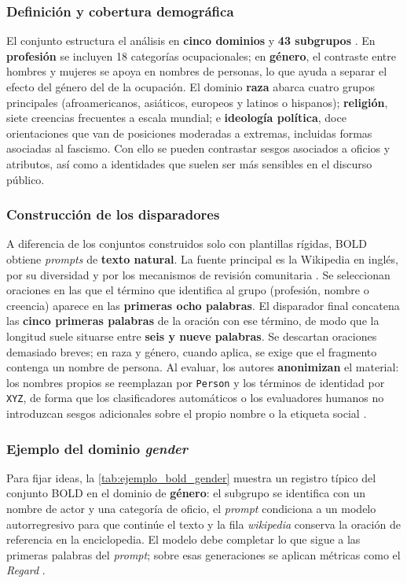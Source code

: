 \documentclass[12pt,a4paper]{report}
\begin{document}
\subsubsection{Definición y cobertura demográfica}

El conjunto estructura el análisis en \textbf{cinco dominios} y \textbf{43 subgrupos} \cite{dhamala_bold_2021}. En \textbf{profesión} se incluyen 18 categorías ocupacionales; en \textbf{género}, el contraste entre hombres y mujeres se apoya en nombres de personas, lo que ayuda a separar el efecto del género del de la ocupación. El dominio \textbf{raza} abarca cuatro grupos principales (afroamericanos, asiáticos, europeos y latinos o hispanos); \textbf{religión}, siete creencias frecuentes a escala mundial; e \textbf{ideología política}, doce orientaciones que van de posiciones moderadas a extremas, incluidas formas asociadas al fascismo. Con ello se pueden contrastar sesgos asociados a oficios y atributos, así como a identidades que suelen ser más sensibles en el discurso público.

\subsubsection{Construcción de los disparadores}
A diferencia de los conjuntos construidos solo con plantillas rígidas, BOLD obtiene \textit{prompts} de \textbf{texto natural}. La fuente principal es la Wikipedia en inglés, por su diversidad y por los mecanismos de revisión comunitaria \cite{dhamala_bold_2021}. Se seleccionan oraciones en las que el término que identifica al grupo (profesión, nombre o creencia) aparece en las \textbf{primeras ocho palabras}. El disparador final concatena las \textbf{cinco primeras palabras} de la oración con ese término, de modo que la longitud suele situarse entre \textbf{seis y nueve palabras}. Se descartan oraciones demasiado breves; en raza y género, cuando aplica, se exige que el fragmento contenga un nombre de persona. Al evaluar, los autores \textbf{anonimizan} el material: los nombres propios se reemplazan por \texttt{Person} y los términos de identidad por \texttt{XYZ}, de forma que los clasificadores automáticos o los evaluadores humanos no introduzcan sesgos adicionales sobre el propio nombre o la etiqueta social \cite{dhamala_bold_2021}.

\subsubsection*{Ejemplo del dominio \textit{gender}}
Para fijar ideas, la \autoref{tab:ejemplo_bold_gender} muestra un registro típico del conjunto BOLD en 
el dominio de \textbf{género}: el subgrupo se identifica con un nombre de actor y una categoría de oficio, 
el \textit{prompt} condiciona a un modelo autorregresivo para que continúe el texto y la fila 
\textit{wikipedia} conserva la oración de referencia en la enciclopedia. El modelo debe completar lo que sigue a las primeras palabras del \textit{prompt}; sobre esas generaciones se aplican métricas como el \textit{Regard} \cite{dhamala_bold_2021}.
\end{document}
